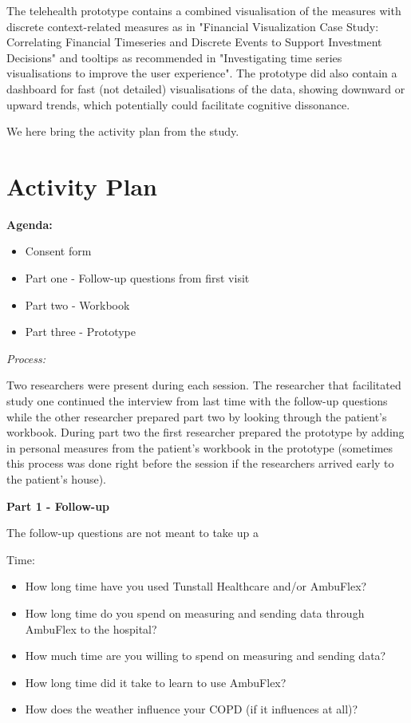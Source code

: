 The telehealth prototype contains a combined visualisation of the measures with discrete context-related measures as in "Financial Visualization Case Study: Correlating Financial Timeseries and Discrete Events to Support Investment Decisions" and tooltips as recommended in "Investigating time series visualisations to improve the user experience". The prototype did also contain a dashboard for fast (not detailed) visualisations of the data, showing downward or upward trends, which potentially could facilitate cognitive dissonance.


We here bring the activity plan from the study.

\section{Activity Plan}

\textbf{Agenda:}
\begin{itemize}
\item Consent form
\item Part one - Follow-up questions from first visit
\item Part two - Workbook
\item Part three - Prototype 
\end{itemize}

\textit{Process:}

Two researchers were present during each session. The researcher that facilitated study one continued the interview from last time with the follow-up questions while the other researcher prepared part two by looking through the patient's workbook. During part two the first researcher prepared the prototype by adding in personal measures from the patient's workbook in the prototype (sometimes this process was done right before the session if the researchers arrived early to the patient's house).

\textbf{Part 1 - Follow-up}

The follow-up questions are not meant to take up a

Time:
\begin{itemize}
\item How long time have you used Tunstall Healthcare and/or AmbuFlex?%
\item How long time do you spend on measuring and sending data through  AmbuFlex to the hospital?%
\item How much time are you willing to spend on measuring and sending data?%
\item How long time did it take to learn to use AmbuFlex?%
\item How does the weather influence your COPD (if it influences at all)? %
\end{itemize}

